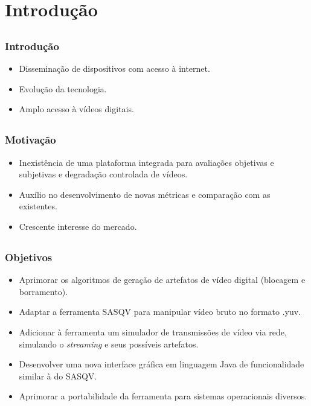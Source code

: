 \section{Introdução}


\subsection{}
    \begin{frame}\frametitle{Introdução}
        \begin{itemize}
            \item Disseminação de dispositivos com acesso à internet. %
            \item Evolução da tecnologia. %
            \item Amplo acesso à vídeos digitais. %
        \end{itemize}
    \end{frame}

\subsection{}
    \begin{frame}\frametitle{Motivação}
        \begin{itemize}
            \item Inexistência de uma plataforma integrada para avaliações objetivas e subjetivas e degradação controlada de vídeos.
            \item Auxílio no desenvolvimento de novas métricas e comparação com as existentes.
            \item Crescente interesse do mercado.
        \end{itemize}
    \end{frame}

\subsection{}
    \begin{frame}\frametitle{Objetivos}
        \begin{itemize}
            \item Aprimorar os algoritmos de geração de artefatos de vídeo digital (blocagem e borramento). %
            \item Adaptar a ferramenta SASQV para manipular vídeo bruto no formato .yuv.
            \item Adicionar à ferramenta um simulador de transmissões de vídeo via rede, simulando o \emph{streaming} e seus possíveis artefatos.
            \item Desenvolver uma nova interface gráfica em linguagem Java de funcionalidade similar à do SASQV.
            \item Aprimorar a portabilidade da ferramenta para sistemas operacionais diversos.
        \end{itemize}
    \end{frame}
    
